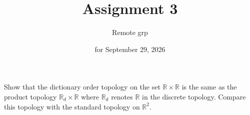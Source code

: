

\title{\huge{Assignment 3}}
\author{\LARGE{Remote grp}}
\date{for September 29, 2026}


\maketitle


\begin{prob*}[Munkres 16.9]
    Show that 
    the dictionary order topology on the set 
    $\mathbb R \times \mathbb R$ is the 
    same as the product topology $\mathbb R_d 
    \times \mathbb R$ where $\mathbb R_d$ renotes 
    $\mathbb R$ in the discrete topology. 
    Compare this topology with the standard 
    topology on $\mathbb R^2$. 
\end{prob*}


